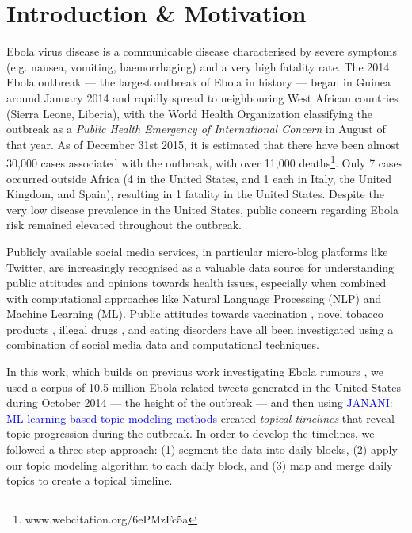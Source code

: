 \documentclass[letterpaper]{article}
\begin{document}
\section{Introduction \& Motivation}
Ebola virus disease is a communicable disease characterised by severe
symptoms (e.g. nausea, vomiting, haemorrhaging) and a very high
fatality rate\cite{WHO-Ebola-Response-Team:2014aa}.   The 2014 Ebola
outbreak --- the largest outbreak of Ebola in history --- began in
Guinea around January 2014 and rapidly spread to neighbouring West
African countries (Sierra Leone, Liberia), with the World Health
Organization classifying the outbreak as a \emph{Public Health
  Emergency of International Concern} in August of that
year\cite{Weyer:2015aa}.  As of December 31st 2015, it is estimated
that there have been almost 30,000 cases associated with the outbreak,
with over 11,000 deaths\footnote{www.webcitation.org/6ePMzFc5a}.  Only 7 cases occurred outside Africa (4 in
the United States, and 1 each in Italy, the United Kingdom, and
Spain), resulting in 1 fatality in the United States.  Despite the
very low disease prevalence in the United States, public concern
regarding Ebola risk remained elevated throughout the
outbreak\cite{Towers:2015aa}.

Publicly available social media services, in particular micro-blog platforms like Twitter, are
increasingly recognised as a valuable data source for understanding
public attitudes and
opinions towards health issues, especially when combined with
computational approaches like Natural
Language Processing (NLP) and Machine Learning (ML)\cite{Dredze:2012qy}.     Public attitudes towards vaccination
\cite{Salathe:2011aa}, novel tobacco products \cite{Myslin:2013aa},
illegal drugs \cite{Krauss:2015aa}, and eating disorders\cite{DBLP:conf/ehealth/Choudhury15} have all been investigated
using a combination of social media data and computational techniques.   


In this work, which builds on previous work investigating
Ebola rumours \cite{DBLP:journals/corr/KalyanamVDCL15},  we used a corpus of 10.5 million Ebola-related tweets
generated in the United States during October 2014 --- the height of
the outbreak ---  and then using \textcolor{blue}{JANANI:  ML learning-based
  topic modeling methods} created \emph{topical timelines} that reveal
topic progression during the outbreak.   In order to develop the
timelines, we followed a three step approach: (1) segment the data into
daily blocks, (2) apply our topic modeling algorithm to each daily
block, and (3) map and merge daily topics to create a topical
timeline. 
\end{document}
